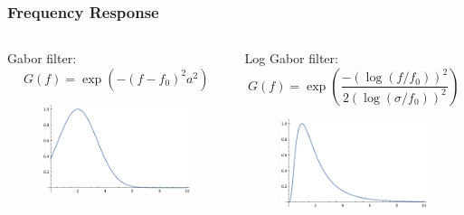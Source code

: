 \documentclass{beamer}
\begin{document}
\begin{frame}
    [fragile] \frametitle{Frequency Response}
    \begin{columns}
        \begin{column}{0.45\textwidth}
            Gabor filter:
            \[
                G(f) = \exp{(-(f-f_0)^2 a^2)}
            \]
            \begin{figure}
                [t] \centering
                \includegraphics[width=\textwidth]{gabor/freq_response_gabor.pdf} \label{fig:gabor}
            \end{figure}
        \end{column}
        \begin{column}{0.45\textwidth}
            Log Gabor filter:
            \[
                G(f) = \exp\left( \frac{-(\log(f/f_0))^2}{2(\log(\sigma/f_0))^2}\right)
            \]
            \begin{figure}
                [t] \centering
                \includegraphics[width=\textwidth]{gabor/freq_response_log_gabor.pdf} \label{fig:gabor}
            \end{figure}
        \end{column}
    \end{columns}
\end{frame}
\end{document}
